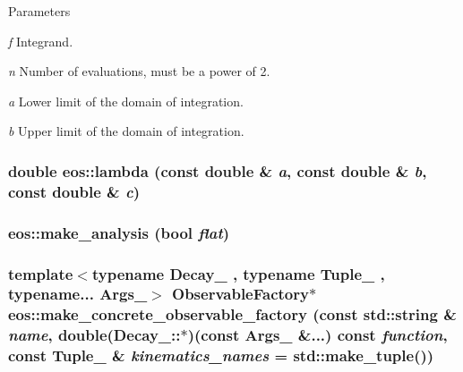 \begin{DoxyParams}{Parameters}
\item[{\em f}]Integrand. \item[{\em n}]Number of evaluations, must be a power of 2. \item[{\em a}]Lower limit of the domain of integration. \item[{\em b}]Upper limit of the domain of integration. \end{DoxyParams}
\hypertarget{namespaceeos_a2e8644357d2012ca279f49ab0037b9ea}{
\subsubsection[{lambda}]{\setlength{\rightskip}{0pt plus 5cm}double eos::lambda (const double \& {\em a}, \/  const double \& {\em b}, \/  const double \& {\em c})}}
\label{namespaceeos_a2e8644357d2012ca279f49ab0037b9ea}
\hypertarget{namespaceeos_ae42e0cf8b4c1c3548fc27a5add336258}{
\subsubsection[{make\_\-analysis}]{ eos::make\_\-analysis (bool {\em flat})}}
\label{namespaceeos_ae42e0cf8b4c1c3548fc27a5add336258}
\hypertarget{namespaceeos_a70620ec1b39b5dbcd70937b6065665a0}{
\subsubsection[{make\_\-concrete\_\-observable\_\-factory}]{\setlength{\rightskip}{0pt plus 5cm}template$<$typename Decay\_\- , typename Tuple\_\- , typename... Args\_\-$>$ {\bf ObservableFactory}$\ast$ eos::make\_\-concrete\_\-observable\_\-factory (const std::string \& {\em name}, \/  double(Decay\_\-::$\ast$)(const Args\_\- \&...) const  {\em function}, \/  const Tuple\_\- \& {\em kinematics\_\-names} = {\ttfamily std::make\_\-tuple()})}}
\label{namespaceeos_a70620ec1b39b5dbcd70937b6065665a0}
